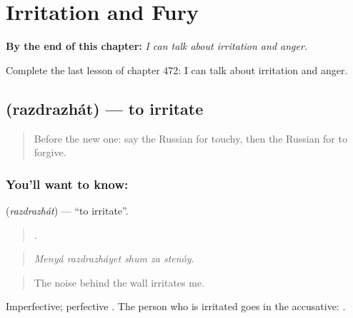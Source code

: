 
\chapter{Irritation and Fury}
\label{ch:ru-irritation-and-fury}

\begin{chapteropening}
\textbf{By the end of this chapter:} \emph{I can talk about irritation and anger.}

Complete the last lesson of chapter 472: I can talk about irritation and anger.
\end{chapteropening}

\section[\texorpdfstring{\ru{раздражать} (razdrazhát)}{раздражать (razdrazhát)}]{ (razdrazhát) — to irritate}

\label{lesson:RU-C472-razdrazhat}



\begin{quote}
Before the new one: say the Russian for touchy, then the Russian for to forgive.
\end{quote}

\subsection*{You'll want to know: }
\textbf{} (\emph{razdrazhát}) — \textquotedblleft{}to irritate\textquotedblright{}.

\begin{quote}
    .
\end{quote}

\begin{quote}
\emph{Menyá razdrazháyet shum za stenóy.}
\end{quote}

\begin{quote}
The noise behind the wall irritates me.
\end{quote}

Imperfective; perfective . The person who is irritated goes in the accusative: \emph{ }.

